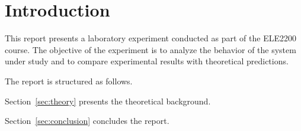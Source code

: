 \section{Introduction}

This report presents a laboratory experiment conducted as part of the ELE2200 course.
The objective of the experiment is to analyze the behavior of the system under study
and to compare experimental results with theoretical predictions.

The report is structured as follows.

Section~\ref{sec:theory} presents the theoretical background.

Section~\ref{sec:conclusion} concludes the report.